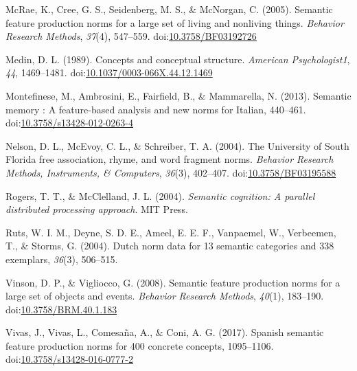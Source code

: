 \documentclass[english,man]{apa6}
\theoremstyle{definition}
\theoremstyle{definition}
\theoremstyle{definition}
\theoremstyle{remark}
\begin{document}
\hypertarget{ref-McRae2005}{}
McRae, K., Cree, G. S., Seidenberg, M. S., \& McNorgan, C. (2005).
Semantic feature production norms for a large set of living and
nonliving things. \emph{Behavior Research Methods}, \emph{37}(4),
547--559.
doi:\href{https://doi.org/10.3758/BF03192726}{10.3758/BF03192726}

\hypertarget{ref-Medin1989}{}
Medin, D. L. (1989). Concepts and conceptual structure. \emph{American
Psychologist1}, \emph{44}, 1469--1481.
doi:\href{https://doi.org/10.1037/0003-066X.44.12.1469}{10.1037/0003-066X.44.12.1469}

\hypertarget{ref-Montefinese2013}{}
Montefinese, M., Ambrosini, E., Fairfield, B., \& Mammarella, N. (2013).
Semantic memory : A feature-based analysis and new norms for Italian,
440--461.
doi:\href{https://doi.org/10.3758/s13428-012-0263-4}{10.3758/s13428-012-0263-4}

\hypertarget{ref-Nelson2004}{}
Nelson, D. L., McEvoy, C. L., \& Schreiber, T. A. (2004). The University
of South Florida free association, rhyme, and word fragment norms.
\emph{Behavior Research Methods, Instruments, \& Computers},
\emph{36}(3), 402--407.
doi:\href{https://doi.org/10.3758/BF03195588}{10.3758/BF03195588}

\hypertarget{ref-Rogers2004}{}
Rogers, T. T., \& McClelland, J. L. (2004). \emph{Semantic cognition: A
parallel distributed processing approach}. MIT Press.

\hypertarget{ref-Ruts2004}{}
Ruts, W. I. M., Deyne, S. D. E., Ameel, E. E. F., Vanpaemel, W.,
Verbeemen, T., \& Storms, G. (2004). Dutch norm data for 13 semantic
categories and 338 exemplars, \emph{36}(3), 506--515.

\hypertarget{ref-Vinson2008}{}
Vinson, D. P., \& Vigliocco, G. (2008). Semantic feature production
norms for a large set of objects and events. \emph{Behavior Research
Methods}, \emph{40}(1), 183--190.
doi:\href{https://doi.org/10.3758/BRM.40.1.183}{10.3758/BRM.40.1.183}

\hypertarget{ref-Vivas2017}{}
Vivas, J., Vivas, L., Comesaña, A., \& Coni, A. G. (2017). Spanish
semantic feature production norms for 400 concrete concepts, 1095--1106.
doi:\href{https://doi.org/10.3758/s13428-016-0777-2}{10.3758/s13428-016-0777-2}
\end{document}
